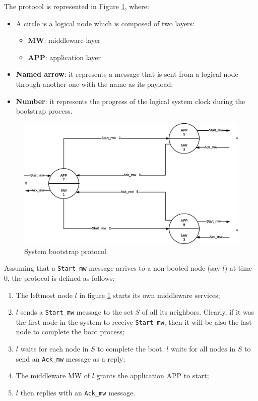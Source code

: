 The protocol is represented in Figure \ref{fig:sys-bootstrap-protocol}, where:

\begin{itemize}
  \item A circle is a logical node which is composed of two layers:
    \begin{itemize}
      \item \textbf{MW}:  middleware layer
      \item \textbf{APP}: application layer
  \end{itemize}
  \item \textbf{Named arrow}: it represents a message that is sent from a
logical node through another one with the name as its payload;
  \item \textbf{Number}: it represents the progress of the logical system clock
during the bootstrap process.
\end{itemize}

\begin{figure}[H]
  \centering
  \includegraphics[width=\columnwidth]{images/solution/bootstrap.eps}
  \caption{System bootstrap protocol}
  \label{fig:sys-bootstrap-protocol}
\end{figure}

Assuming that a \texttt{Start\_mw} message arrives to a non-booted node (say
$l$) at time 0, the protocol is defined as follows:

\begin{enumerate}
\item The leftmost node $l$ in figure \ref{fig:sys-bootstrap-protocol}
  starts its own middleware services;
\item $l$ sends a \texttt{Start\_mw} message to the set $S$ of all its
  neighbors. Clearly, if it was the first node in the system to receive
  \texttt{Start\_mw}, then it will be also the last node to complete the
  boot process;
\item $l$ waits for each node in $S$ to complete the boot. $l$ waits for all
  nodes in $S$ to send an \texttt{Ack\_mw} message as a reply;
\item The middleware MW of $l$ grants the application APP to start;
\item $l$ then replies with an \texttt{Ack\_mw} message.
\end{enumerate}

